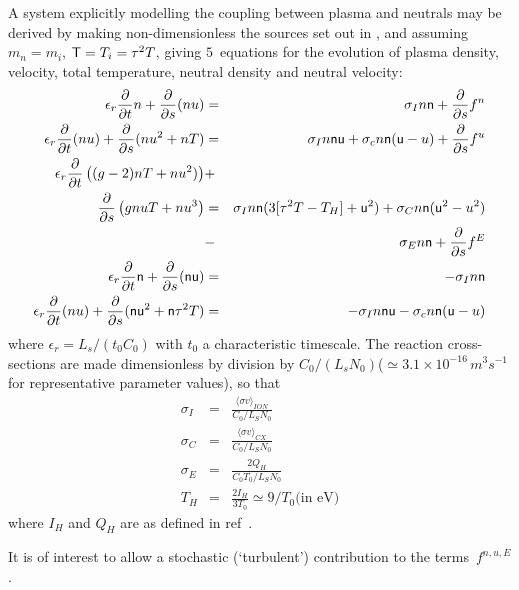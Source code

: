 A system explicitly modelling the coupling between plasma and neutrals may be derived by making
non-dimensionless the sources set out in , and assuming $m_n=m_i$, ${\sf T}=T_i=\tau^2 T$,
giving $5$~equations for the evolution of plasma density, velocity, total temperature,
neutral density and neutral velocity:
\begin{eqnarray}\label{eq:syscn}
\epsilon_r \frac{\partial}{\partial t} n + 
\frac{\partial}{\partial s} (nu)&=& \sigma_I n {\sf n}+\frac{\partial}{\partial s} f^n\\
\epsilon_r \frac{\partial}{\partial t} (nu)+ 
\frac{\partial}{\partial s} (nu^2+nT)&=&
\sigma_I n {\sf n} {\sf u} + \sigma_c n {\sf n} ({\sf u}-u)+\frac{\partial}{\partial s} f^u \label{eq:syscu}\\
\epsilon_r \frac{\partial}{\partial t}\left( (g-2) nT+
 nu^2) \right) &+& \nonumber\\
\frac{\partial}{\partial s} \left( g nuT +
nu^3 \right) &=& \sigma_I n {\sf n} (3[\tau^2 T -T_H]+{\sf u}^2)
+\sigma_C n {\sf n} ({\sf u}^2-u^2) \nonumber\\
&-&\sigma_E n {\sf n}
+ \frac{\partial}{\partial s} f^E \label{eq:sysct}\\
\epsilon_r \frac{\partial}{\partial t} {\sf n} + 
\frac{\partial}{\partial s} ({\sf n} {\sf u})&=& -\sigma_I n {\sf n}\label{eq:syscnn}\\
\epsilon_r \frac{\partial}{\partial t} (nu)+ 
\frac{\partial}{\partial s} ({\sf n} {\sf u}^2+{\sf n} \tau^2 T)&=&
-\sigma_I n {\sf n} {\sf u} - \sigma_c n {\sf n} ({\sf u}-u) \label{eq:syscnu}
\end{eqnarray}
where $\epsilon_r=L_s/(t_0 C_0)$ with $t_0$ a characteristic timescale. The reaction cross-sections
are made dimensionless by division by $C_0/(L_s N_0)$($\simeq 3.1 \times 10^{-16}\,m^3 s^{-1}$ for
representative parameter values), so that
\begin{eqnarray}\label{eq:csigma}
\sigma_I &=& \frac{\langle \sigma v \rangle_{ION}}{C_0/L_S N_0}\\
\sigma_C &=& \frac{\langle \sigma v \rangle_{CX}}{C_0/L_S N_0}\\
\sigma_E &=& \frac{2 Q_H}{C_0 T_0/L_S N_0}\\
T_H&=&\frac{2 I_H}{3 T_0} \simeq 9/T_0 \mbox{(in eV)}
\end{eqnarray}
where $I_H$ and $Q_H$ are as defined in ref~\cite{Ha13Benc}.

It is of interest to allow a stochastic (`turbulent') contribution to the terms~$f^{n,u,E}$.


